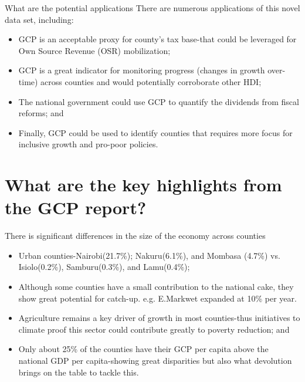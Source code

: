 \documentclass{beamer}
\begin{document}
\begin{frame}{What are the potential applications}
There are numerous applications of this novel data set, including:
  \begin{itemize}
        \item GCP is an acceptable proxy for county's tax base-that could be leveraged for Own Source Revenue (OSR) mobilization;
        \item GCP is a great indicator for monitoring progress (changes in growth over-time) across counties and would potentially corroborate other HDI; 
        \item The national government could use GCP to quantify the dividends from fiscal reforms; and 
        \item Finally, GCP could be used to identify counties that requires more focus for inclusive growth and pro-poor policies. 
    \end{itemize}
\end{frame}

\section{What are the key highlights from the GCP report?}
\begin{frame}{There is significant differences in the size of the economy across counties}
\begin{itemize}
        \item Urban counties-Nairobi(21.7\%); Nakuru(6.1\%), and Mombasa (4.7\%) vs. Isiolo(0.2\%), Samburu(0.3\%), and Lamu(0.4\%);
        \item Although some counties have a small contribution to the national cake, they show great potential for catch-up. e.g. E.Markwet expanded at 10\% per year. 
        \item Agriculture remains a key driver of growth in most counties-thus initiatives to climate proof this sector could contribute greatly to poverty reduction; and 
        \item Only about 25\% of the counties have their GCP per capita above the national GDP per capita-showing great disparities but also what devolution brings on the table to tackle this. 
    \end{itemize}
\end{frame}
\end{document}
